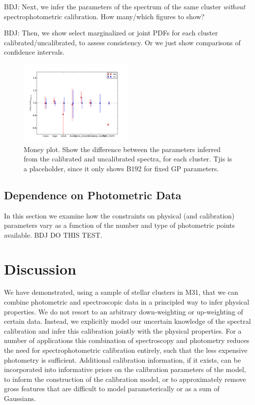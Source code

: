 \documentclass[iop,numberedappendix]{emulateapj}
\begin{document}
BDJ: Next, we infer the parameters of the spectrum of the same cluster
\emph{without} spectrophotometric calibration.  How many/which figures
to show?

BDJ: Then, we show select marginalized or joint PDFs for each cluster
calibrated/uncalibrated, to assess consistency.  Or we just show
comparisons of confidence intervals.

\begin{figure}[h!]
\includegraphics[width =0.5\textwidth]{figures/B192_020_cratio.pdf}
\caption{Money plot.  Show the difference between the parameters
  inferred from the calibrated and uncalibrated spectra, for each
  cluster. Tjis is a placeholder, since it only shows B192 for fixed
  GP parameters. \label{fig:boom}}
\end{figure}

\subsection{Dependence on Photometric Data}
In this section we examine how the constraints on physical (and
calibration) parameters vary as a function of the number and type of
photometric points available. {\color{red} BDJ DO THIS TEST.}

\section{Discussion}

We have demonstrated, using a sample of stellar clusters in M31, that
we can combine photometric and spectroscopic data in a principled way
to infer physical properties.  We do not resort to an arbitrary
down-weighting or up-weighting of certain data. Instead, we explicitly
model our uncertain knowledge of the spectral calibration and infer
this calibration jointly with the physical properties. For a number of
applications this combination of spectroscopy and photometry reduces
the need for spectrophotometric calibration entirely, such that the less
expensive photometry is sufficient.  Additional calibration
information, if it exists, can be incorporated into informative priors
on the calibration parameters of the model, to inform the construction
of the calibration model, or to approximately remove gross features
that are difficult to model parameterically or as a sum of Gaussians.
\end{document}
